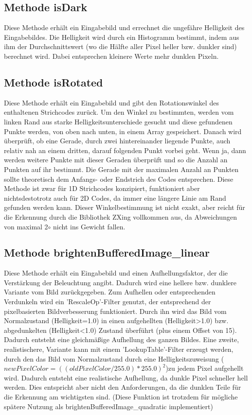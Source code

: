 \subsection*{Methode isDark}
Diese Methode erhält ein Eingabebild und errechnet die ungefähre Helligkeit des Eingabebildes.
Die Helligkeit wird durch ein Histogramm bestimmt, indem aus ihm der Durchschnittswert (wo die Hälfte aller Pixel heller bzw. dunkler sind) berechnet wird. Dabei entsprechen kleinere Werte mehr dunklen Pixeln.


\subsection*{Methode isRotated}
Diese Methode erhält ein Eingabebild und gibt den Rotationswinkel des enthaltenen Strichcodes zurück.
Um den Winkel zu bestimmten, werden vom linken Rand aus starke Helligkeitsunterschiede gesucht und diese gefundenen Punkte werden, von oben nach unten, in einem Array gespeichert. Danach wird überprüft, ob eine Gerade, durch zwei hintereinander liegende Punkte, auch relativ nah an einem dritten, darauf folgenden Punkt vorbei geht. Wenn ja, dann werden weitere Punkte mit dieser Geraden überprüft und so die Anzahl an Punkten auf ihr bestimmt. Die Gerade mit der maximalen Anzahl an Punkten sollte theoretisch dem Anfangs- oder Endstrich des Codes entsprechen.
Diese Methode ist zwar für 1D Strichcodes konzipiert, funktioniert aber nichtsdestotrotz auch für 2D Codes, da immer eine längere Linie am Rand gefunden werden kann.
Dieser Winkelbestimmung ist nicht exakt, aber reicht für die Erkennung durch die Bibliothek ZXing vollkommen aus, da Abweichungen von maximal 2$ \circ $ nicht ins Gewicht fallen.
 

\subsection*{Methode brightenBufferedImage\_linear}
Diese Methode erhält ein Eingabebild und einen Aufhellungsfaktor, der die Verstärkung der Beleuchtung angibt. Dadurch wird eine hellere bzw. dunklere Variante vom Bild zurückgegeben.
Zum Aufhellen oder entsprechenden Verdunkeln wird ein 'RescaleOp'-Filter genutzt, der entsprechend der pixelbasierten Bildverbesserung funktioniert. Durch ihn wird das Bild vom Normalzustand (Helligkeit=1.0) in einen aufgehellten (Helligkeit>1.0) bzw. abgedunkelten (Helligkeit<1.0) Zustand überführt (plus einem Offset von 15).
Dadurch entsteht eine gleichmäßige Aufhellung des ganzen Bildes.
Eine zweite, realistischere, Variante kann mit einem 'LookupTable'-Filter erzeugt werden, durch den das Bild vom Normalzustand durch eine Helligkeitszuweisung
($newPixelColor = ((oldPixelColor/255.0) * 255.0)^2$)zu jedem Pixel aufgehellt wird.
Dadurch entsteht eine realistische Aufhellung, da dunkle Pixel schneller hell werden. Dies entspricht aber nicht den Anforderungen, da die dunklen Teile für die Erkennung am wichtigsten sind. (Diese Funktion ist trotzdem für mögliche spätere Nutzung als brightenBufferedImage\_quadratic implementiert)


